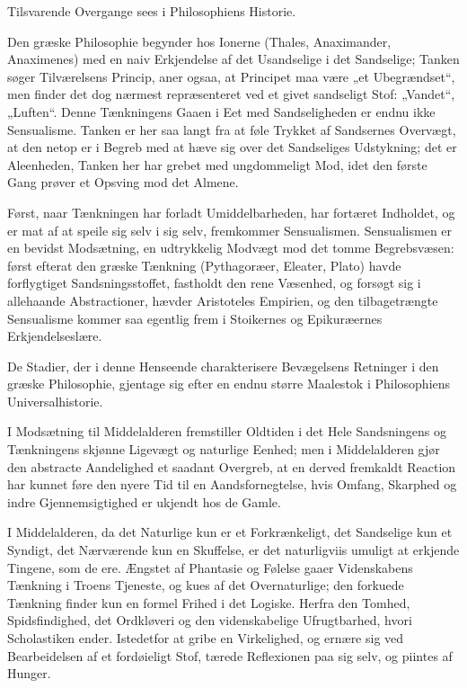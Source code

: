 \documentclass[12pt]{book}
\newcommand{\opage}[1]{\marginnote{\footnotesize\textit{[#1]}}}
\begin{document}
Tilsvarende Overgange sees i Philosophiens Historie.

Den græske Philosophie begynder hos Ionerne (Thales, Anaximander, Anaximenes) med
en naiv Erkjendelse af det Usandselige i det Sandselige; Tanken søger
Tilværelsens Princip, aner ogsaa, at Principet maa være „et Ubegrændset“, men
finder det dog nærmest repræsenteret ved et givet sandseligt Stof: „Vandet“,
„Luften“. Denne Tænkningens Gaaen i Eet med Sandseligheden er endnu ikke
Sensualisme. Tanken er her saa langt fra at føle Trykket af Sandsernes Overvægt,
at den netop er i Begreb med at hæve sig over det Sandseliges Udstykning; det er
Aleenheden, Tanken her har grebet med ungdommeligt Mod, idet den første Gang
prøver et Opsving mod det Almene.

Først, naar Tænkningen har forladt Umiddelbarheden, har fortæret Indholdet, og er
mat af at speile sig selv i sig selv, fremkommer Sensualismen. Sensualismen er en
bevidst Modsætning, en udtrykkelig Modvægt mod det tomme Begrebsvæsen: først
efterat den græske Tænkning (Pythagoræer, Eleater, Plato) havde forflygtiget
Sandsningsstoffet, fastholdt den rene Væsenhed, og forsøgt sig i allehaande
Abstractioner, hævder Aristoteles Empirien, og den tilbagetrængte Sensualisme
kommer saa egentlig frem i Stoikernes og Epikuræernes Erkjendelseslære.

De Stadier, der i denne Henseende charakterisere Bevægelsens Retninger i den
græske Philosophie, gjentage sig efter en endnu større Maalestok i Philosophiens
Universalhistorie.

I Modsætning til Middelalderen fremstiller Oldtiden i det Hele Sandsningens og
Tænkningens skjønne Ligevægt og naturlige Eenhed; men i Middelalderen gjør den
abstracte
\opage{9} Aandelighed et saadant Overgreb, at en derved fremkaldt Reaction har kunnet føre
den nyere Tid til en Aandsfornegtelse, hvis Omfang, Skarphed og indre
Gjennemsigtighed er ukjendt hos de Gamle.

I Middelalderen, da det Naturlige kun er et Forkrænkeligt, det Sandselige kun et
Syndigt, det Nærværende kun en Skuffelse, er det naturligviis umuligt at erkjende
Tingene, som de ere. Ængstet af Phantasie og Følelse gaaer Videnskabens Tænkning i
Troens Tjeneste, og kues af det Overnaturlige; den forkuede Tænkning finder kun en
formel Frihed i det Logiske. Herfra den Tomhed, Spidsfindighed, det Ordkløveri og
den videnskabelige Ufrugtbarhed, hvori Scholastiken ender. Istedetfor at gribe en
Virkelighed, og ernære sig ved Bearbeidelsen af et fordøieligt Stof, tærede
Reflexionen paa sig selv, og piintes af Hunger.
\end{document}
